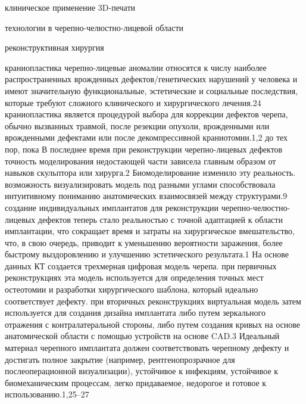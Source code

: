 клиническое применение 3D-печати

технологии в черепно-челюстно-лицевой области

реконструктивная хирургия

краниопластика
черепно-лицевые аномалии относятся к числу наиболее распространенных врожденных
дефектов/генетических нарушений у человека и имеют значительную
функциональные, эстетические и социальные последствия, которые требуют сложного
клинического и хирургического лечения.24 краниопластика является процедурой
выбора для коррекции дефектов черепа, обычно вызванных травмой, после резекции
опухоли, врожденными или врожденными дефектами или после декомпрессивной
краниотомии.1,2 до тех пор, пока В последнее время при реконструкции
черепно-лицевых дефектов точность моделирования недостающей части зависела
главным образом от навыков скульптора или хирурга.2 Биомоделирование изменило
эту реальность. возможность визуализировать модель под разными углами
способствовала интуитивному пониманию анатомических взаимосвязей между
структурами.9 создание индивидуальных имплантатов для реконструкции
черепно-челюстно-лицевых дефектов теперь стало реальностью с точной адаптацией к
области имплантации, что сокращает время и затраты на хирургическое
вмешательство, что, в свою очередь, приводит к уменьшению вероятности заражения,
более быстрому выздоровлению и улучшению эстетического результата.1 На основе
данных КТ создается трехмерная цифровая модель черепа. при первичных
реконструкциях эта модель используется для определения точных мест остеотомии и
разработки хирургического шаблона, который идеально соответствует дефекту. при
вторичных реконструкциях виртуальная модель затем используется для создания
дизайна имплантата либо путем зеркального отражения с контралатеральной стороны,
либо путем создания кривых на основе анатомической области с помощью устройств
на основе CAD.3 Идеальный материал черепного имплантата должен соответствовать
черепному дефекту и достигать полное закрытие (например, рентгенопрозрачное для
послеоперационной визуализации), устойчивое к инфекциям, устойчивое к
биомеханическим процессам, легко придаваемое, недорогое и готовое к
использованию.1,25–27


